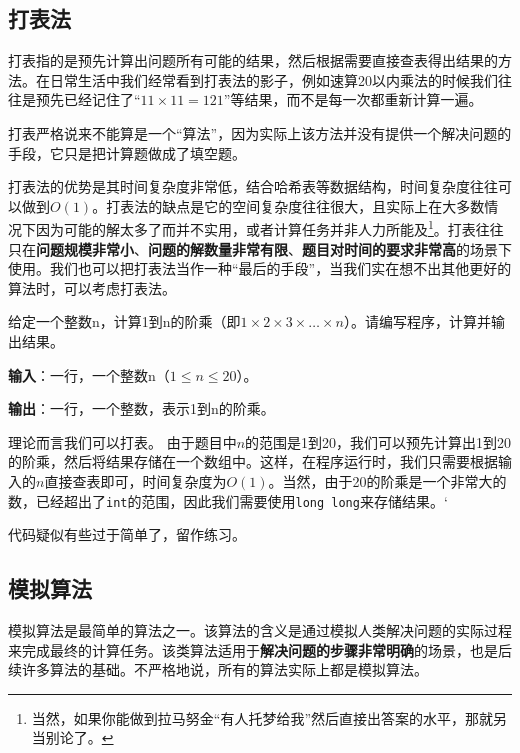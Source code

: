 \documentclass{article}
\begin{document}
\subsection{打表法}

打表指的是预先计算出问题所有可能的结果，然后根据需要直接查表得出结果的方法。在日常生活中我们经常看到打表法的影子，例如速算20以内乘法的时候我们往往是预先已经记住了“$11\times 11 = 121$”等结果，而不是每一次都重新计算一遍。

打表严格说来不能算是一个“算法”，因为实际上该方法并没有提供一个解决问题的手段，它只是把计算题做成了填空题。

打表法的优势是其时间复杂度非常低，结合哈希表等数据结构，时间复杂度往往可以做到$O(1)$。打表法的缺点是它的空间复杂度往往很大，且实际上在大多数情况下因为可能的解太多了而并不实用，或者计算任务并非人力所能及\footnote{当然，如果你能做到拉马努金“有人托梦给我”然后直接出答案的水平，那就另当别论了。}。打表往往只在\textbf{问题规模非常小}、\textbf{问题的解数量非常有限}、\textbf{题目对时间的要求非常高}的场景下使用。我们也可以把打表法当作一种“最后的手段”，当我们实在想不出其他更好的算法时，可以考虑打表法。

\begin{example}
  给定一个整数n，计算1到n的阶乘（即$1\times 2\times 3\times \dots \times n$）。请编写程序，计算并输出结果。

  \textbf{输入}：一行，一个整数n（$1\le n \le 20$）。

  \textbf{输出}：一行，一个整数，表示1到n的阶乘。
\end{example}

\begin{soln}
  理论而言我们可以打表。 由于题目中$n$的范围是1到20，我们可以预先计算出1到20的阶乘，然后将结果存储在一个数组中。这样，在程序运行时，我们只需要根据输入的$n$直接查表即可，时间复杂度为$O(1)$。当然，由于20的阶乘是一个非常大的数，已经超出了\texttt{int}的范围，因此我们需要使用\texttt{long long}来存储结果。‘

  代码疑似有些过于简单了，留作练习。
\end{soln}

\subsection{模拟算法}

模拟算法是最简单的算法之一。该算法的含义是通过模拟人类解决问题的实际过程来完成最终的计算任务。该类算法适用于\textbf{解决问题的步骤非常明确}的场景，也是后续许多算法的基础。不严格地说，所有的算法实际上都是模拟算法。
\end{document}
